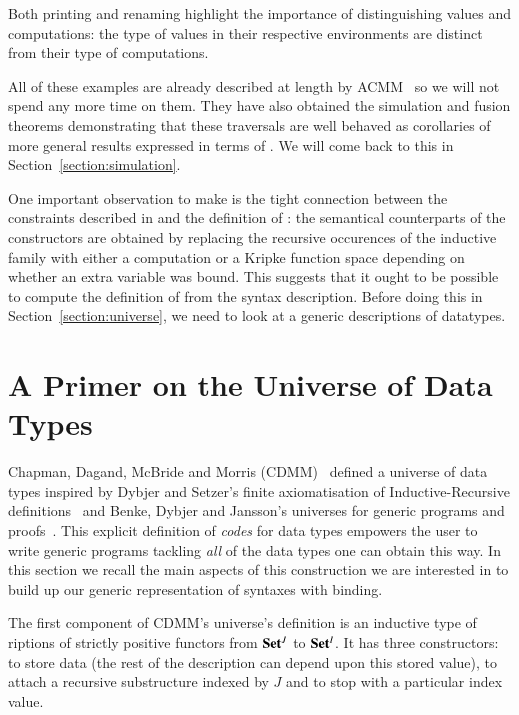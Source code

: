 Both printing and renaming highlight the importance of distinguishing
values and computations: the type of values in their respective
environments are distinct from their type of computations.

All of these examples are already described at length by ACMM~\citeyear{allais2017type}
so we will not spend any
more time on them. They have also obtained the simulation and fusion
theorems demonstrating that these traversals are well behaved as
corollaries of more general results expressed in terms of \semfun{}.
We will come back to this in Section~\ref{section:simulation}.

One important observation to make is the tight connection between the constraints
described in \semrec{} and the definition of : the semantical counterparts
of the  constructors are obtained by replacing the recursive occurences of
the inductive family with either a computation or a Kripke function space depending
on whether an extra variable was bound. This suggests that it ought to be possible
to compute the definition of \semrec{} from the syntax description. Before doing this
in Section~\ref{section:universe}, we need to look at a generic descriptions of
datatypes.




\section{A Primer on the Universe of Data Types}\label{section:data}

Chapman, Dagand, McBride and Morris (CDMM)~\citeyear{Chapman:2010:GAL:1863543.1863547}
defined a universe of data types inspired by Dybjer and Setzer's
finite axiomatisation of Inductive-Recursive definitions~\citeyear{Dybjer1999}
and Benke, Dybjer and Jansson's universes for generic programs and proofs~\citeyear{benke-ugpp}.
This explicit definition of \emph{codes} for data types empowers the
user to write generic programs tackling \emph{all} of the data types
one can obtain this way. In this section we recall the main aspects
of this construction we are interested in to build up our generic
representation of syntaxes with binding.

The first component of CDMM's universe's definition is an inductive type
of riptions of strictly positive functors from $\mathbf{Set}{}^J$ to
$\mathbf{Set}{}^I$. It has three constructors:  to store data (the rest of
the description can depend upon this stored value),  to attach a
recursive substructure indexed by $J$ and  to stop with a particular
index value.

